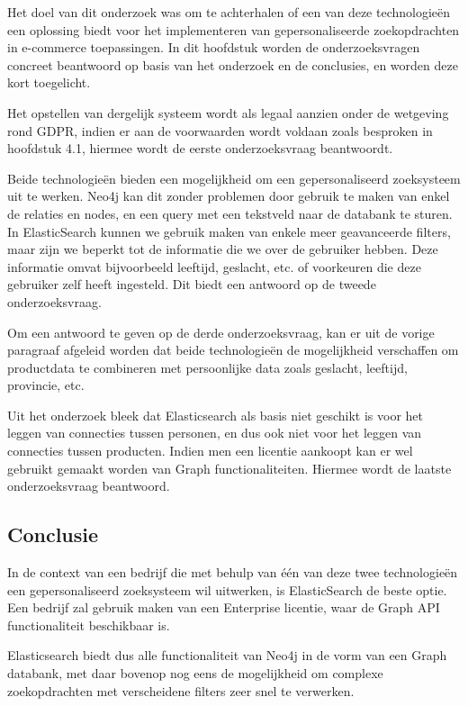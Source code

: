 Het doel van dit onderzoek was om te achterhalen of een van deze technologieën een oplossing biedt voor het implementeren van gepersonaliseerde zoekopdrachten in e-commerce toepassingen. In dit hoofdstuk worden de onderzoeksvragen concreet beantwoord op basis van het onderzoek en de conclusies, en worden deze kort toegelicht.


Het opstellen van dergelijk systeem wordt als legaal aanzien onder de wetgeving rond GDPR, indien er aan de voorwaarden wordt voldaan zoals besproken in hoofdstuk 4.1, hiermee wordt de eerste onderzoeksvraag beantwoordt.
	
Beide technologieën bieden een mogelijkheid om een gepersonaliseerd zoeksysteem uit te werken. Neo4j kan dit zonder problemen  door gebruik te maken van enkel de relaties en nodes, en een query met een tekstveld naar de databank te sturen.
In ElasticSearch kunnen we gebruik maken van enkele meer geavanceerde filters, maar zijn we beperkt tot de informatie die we over de gebruiker hebben. Deze informatie omvat bijvoorbeeld leeftijd, geslacht, etc. of voorkeuren die deze gebruiker zelf heeft ingesteld. Dit biedt een antwoord op de tweede onderzoeksvraag.
	
Om een antwoord te geven op de derde onderzoeksvraag, kan er uit de vorige paragraaf afgeleid worden dat beide technologieën de mogelijkheid verschaffen om productdata te combineren met persoonlijke data zoals geslacht, leeftijd, provincie, etc. 

Uit het onderzoek bleek dat Elasticsearch als basis niet geschikt is voor het leggen van connecties tussen personen, en dus ook niet voor het leggen van connecties tussen producten. Indien men een licentie aankoopt kan er wel gebruikt gemaakt worden van Graph functionaliteiten. Hiermee wordt de laatste onderzoeksvraag beantwoord.


\subsection{Conclusie}
\label{subsec:finalConclusie}

In de context van een bedrijf die met behulp van één van deze twee technologieën een gepersonaliseerd zoeksysteem wil uitwerken, is ElasticSearch de beste optie. Een bedrijf zal gebruik maken van een Enterprise licentie, waar de Graph API functionaliteit beschikbaar is.

Elasticsearch biedt dus alle functionaliteit van Neo4j in de vorm van een Graph databank, met daar bovenop nog eens de mogelijkheid om complexe zoekopdrachten met verscheidene filters zeer snel te verwerken. 

